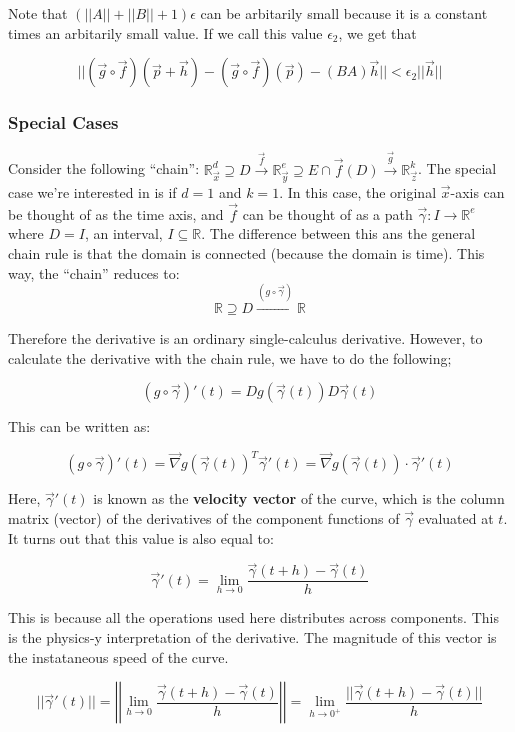 \documentclass[11 pt, twoside]{article}
\newcommand{\gradient}{\vec{\nabla}}
\begin{document}
Note that $(||A|| + ||B|| + 1) \epsilon$ can be arbitarily small because it
is a constant times an arbitarily small value. If we call this value
$\epsilon_2$, we get that

\[
||(\vec{g} \circ \vec{f})(\vec{p} + \vec{h}) - (\vec{g} \circ
\vec{f})(\vec{p}) - (BA) \vec{h}||
< \epsilon_2 ||\vec{h}||
\]

\subsubsection{Special Cases}

Consider the following ``chain'': $\mathbb{R}^d_{\vec{x}} \supseteq D
\overset{\vec{f}}{\to} \mathbb{R}^e_{\vec{y}} \supseteq E \cap \vec{f}(D)
\overset{\vec{g}}{\to} \mathbb{R}^k_{\vec{z}}$. The special case we're
interested in is if $d = 1$ and $k = 1$. In this case, the original $\vec{x}$-axis can be
thought of as the time axis, and $\vec{f}$ can be thought of as a path
$\vec{\gamma}: I \to \mathbb{R}^e$ where $D = I$, an interval, $I \subseteq
\mathbb{R}$. The difference between this ans the general chain rule is that
the domain is connected (because the domain is time). This way, the ``chain''
reduces to: 
$$\mathbb{R} \supseteq D \overset{(g \circ
\vec{\gamma})}{\longrightarrow} \mathbb{R}$$

Therefore the derivative is an ordinary single-calculus derivative. However, to
calculate the derivative with the chain rule, we have to do the following;

$$(g \circ \vec{\gamma})'(t) = Dg(\vec{\gamma}(t))D\vec{\gamma}(t)$$

This can be written as:

$$(g \circ \vec{\gamma})'(t) = \gradient g(\vec{\gamma}(t))^T \vec{\gamma}'(t) =
\boxed{\gradient g(\vec{\gamma}(t))\cdot\vec{\gamma}'(t)}$$

Here, $\vec{\gamma}'(t)$ is known as the \textbf{velocity vector} of the curve,
which is the column matrix (vector) of the derivatives of the component
functions of $\vec{\gamma}$ evaluated at $t$. It turns out that this value is
also equal to:

$$\vec{\gamma}'(t) = \lim_{h \to 0} \frac{\vec{\gamma}(t + h) -
\vec{\gamma}(t)}{h}$$

This is because all the operations used here distributes across components. This
is the physics-y interpretation of the derivative. The magnitude of this vector
is the instataneous speed of the curve.

$$ ||\vec{\gamma}'(t)|| = \left|\left|\lim_{h \to 0} \frac{\vec{\gamma}(t + h) -
\vec{\gamma}(t)}{h}\right|\right| = \lim_{h \to 0^+} \frac{||\vec{\gamma}(t + h) -
\vec{\gamma}(t)||}{h}$$
\end{document}
